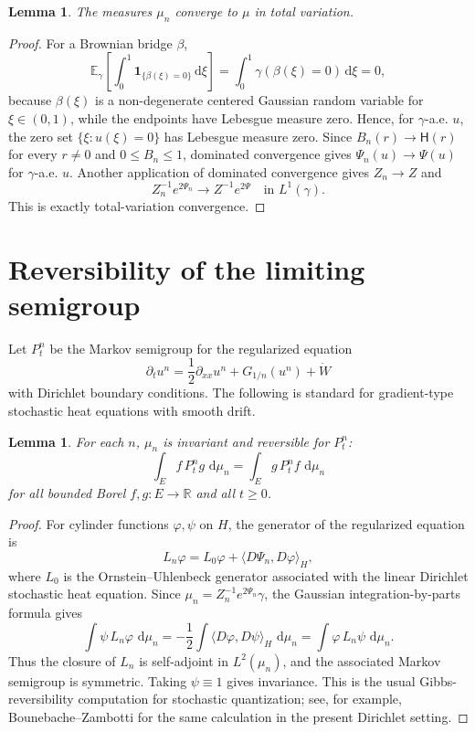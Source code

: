 \documentclass[11pt]{article}
\numberwithin{equation}{section}
\newtheorem{lemma}[theorem]{Lemma}
\newcommand{\dd}{\,\mathrm d}
\newcommand{\1}{\mathbf 1}
\newcommand{\E}{\mathbb E}
\newcommand{\R}{\mathbb R}
\begin{document}
\begin{lemma}\label{lem:mu-n-tv}
The measures $\mu_n$ converge to $\mu$ in total variation.
\end{lemma}

\begin{proof}
For a Brownian bridge $\beta$,
\[
    \E_\gamma\!\left[\int_0^1 \1_{\{\beta(\xi)=0\}}\dd \xi\right]
    =\int_0^1 \gamma(\beta(\xi)=0)\dd \xi=0,
\]
because $\beta(\xi)$ is a non-degenerate centered Gaussian random variable for
$\xi\in(0,1)$, while the endpoints have Lebesgue measure zero. Hence, for
$\gamma$-a.e. $u$, the zero set $\{\xi:u(\xi)=0\}$ has Lebesgue measure zero.
Since $B_n(r)\to \mathsf H(r)$ for every $r\neq0$ and $0\leq B_n\leq1$, dominated
convergence gives $\Psi_n(u)\to\Psi(u)$ for $\gamma$-a.e. $u$. Another application
of dominated convergence gives $Z_n\to Z$ and
\[
        Z_n^{-1}e^{2\Psi_n}\longrightarrow Z^{-1}e^{2\Psi}
        \quad\text{in }L^1(\gamma).
\]
This is exactly total-variation convergence.
\end{proof}

\section{Reversibility of the limiting semigroup}

Let $P_t^n$ be the Markov semigroup for the regularized equation
\[
    \partial_t u^n=\frac12\partial_{xx}u^n+G_{1/n}(u^n)+\dot W
\]
with Dirichlet boundary conditions. The following is standard for gradient-type
stochastic heat equations with smooth drift.

\begin{lemma}\label{lem:approx-reversible}
For each $n$, $\mu_n$ is invariant and reversible for $P_t^n$:
\[
        \int_E f\,P_t^n g\,\dd\mu_n
        =
        \int_E g\,P_t^n f\,\dd\mu_n
\]
for all bounded Borel $f,g:E\to\R$ and all $t\geq0$.
\end{lemma}

\begin{proof}
For cylinder functions $\varphi,\psi$ on $H$, the generator of the regularized
equation is
\[
        L_n\varphi=L_0\varphi+\langle D\Psi_n,D\varphi\rangle_H,
\]
where $L_0$ is the Ornstein--Uhlenbeck generator associated with the linear
Dirichlet stochastic heat equation. Since $\mu_n=Z_n^{-1}e^{2\Psi_n}\gamma$, the
Gaussian integration-by-parts formula gives
\[
        \int \psi\,L_n\varphi\,\dd\mu_n
        =
        -\frac12\int \langle D\varphi,D\psi\rangle_H\,\dd\mu_n
        =
        \int \varphi\,L_n\psi\,\dd\mu_n .
\]
Thus the closure of $L_n$ is self-adjoint in $L^2(\mu_n)$, and the associated
Markov semigroup is symmetric. Taking $\psi\equiv1$ gives invariance. This is the
usual Gibbs-reversibility computation for stochastic quantization; see, for example,
Bounebache--Zambotti \cite[Section 4]{BZ14} for the same calculation in the present
Dirichlet setting.
\end{proof}
\end{document}
